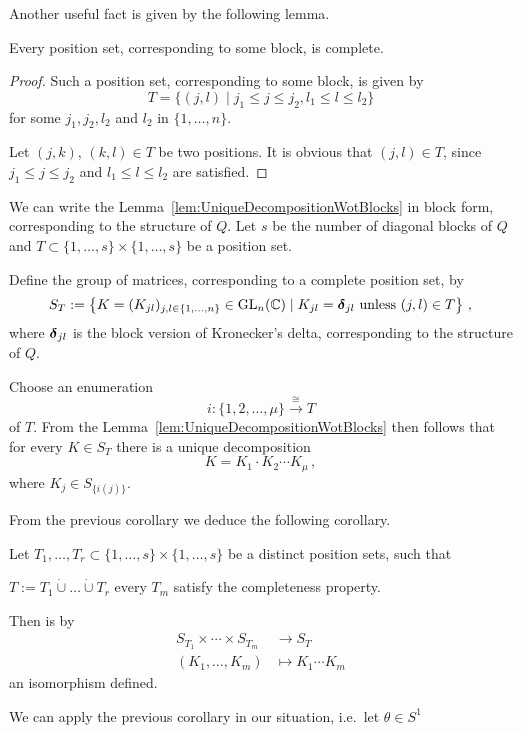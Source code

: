 Another useful fact is given by the following lemma.
\begin{lem}
  Every position set, corresponding to some block, is complete.
\end{lem}
\begin{proof}
  Such a position set, corresponding to some block, is given by
  \[
    T=\{(j,l)\mid j_1\leq j\leq j_2, l_1\leq l\leq l_2\}
  \]
  for some $j_1,j_2,l_2$ and $l_2$ in $\{1,\dots,n\}$.

  Let $(j,k)$, $(k,l)\in T$ be two positions.
  It is obvious that $(j,l)\in T$, since $j_1\leq j\leq j_2$ and
  $l_1\leq l\leq l_2$ are satisfied.
\end{proof}
\begin{cor}
  We can write the Lemma~\ref{lem:UniqueDecompositionWotBlocks} in block form,
  corresponding to the structure of $Q$.
  Let $s$ be the number of diagonal blocks of $Q$ and
  $T\subset\{1,\dots,s\}\times\{1,\dots,s\}$ be a position set.
  \begin{s-defn}
    Define the group of matrices, corresponding to a complete position set, by
    \[
      S_T:=\left\{K=(K_{jl})_{j,l\in\{1,\dots,n\}}\in\operatorname{GL}_n(\mathbb{C})\mid
      K_{jl}=\boldsymbol{\delta}_{jl} \text{~unless~} (j,l)\in T \right\} \,,
    \]
    where $\boldsymbol{\delta}_{jl}$ is the block version of Kronecker's delta,
    corresponding to the structure of $Q$.
  \end{s-defn}
  Choose an enumeration
  \[
    i:\{1,2,\dots,\mu\}\overset{\cong}{\to}T
  \]
  of $T$.
  From the Lemma~\ref{lem:UniqueDecompositionWotBlocks} then follows that for
  every $K\in S_T$ there is a unique decomposition
  \[
    K=K_1\cdot K_2\cdots K_\mu \,,
  \]
  where $K_j\in S_{\{i(j)\}}$.
\end{cor}
From the previous corollary we deduce the following corollary.
\begin{cor}\label{cor:composeLevelwise}
  Let $T_1,\dots,T_r\subset\{1,\dots,s\}\times\{1,\dots,s\}$ be a distinct
  position sets, such that
  \begin{einr}
    $T:=T_1\dot\cup\dots\dot\cup T_r$  every $T_m$ satisfy
    the completeness property.
  \end{einr}
  Then is by
  \begin{align*}
    S_{T_1}\times\cdots\times S_{T_m} &\longrightarrow S_T
  \\(K_1,\dots,K_m) &\longmapsto K_1\cdots K_m
  \end{align*}
  an isomorphism defined.
\end{cor}
We can apply the previous corollary in our situation, i.e.\ let $\theta\in S^1$
